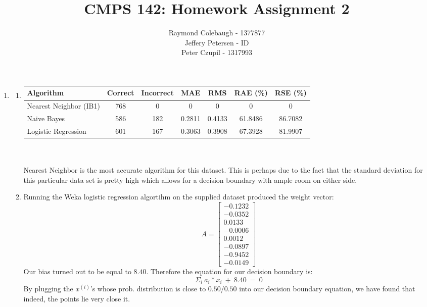 \documentclass{article}
\title{CMPS 142: Homework Assignment 2}
\author{Raymond Colebaugh - 1377877\\Jeffery Petersen - ID\\Peter Czupil - 1317993}
\begin{document}
\maketitle
\begin{enumerate}
        \item 
            \begin{enumerate}
                \item
                    \begin{tabular}{l | c c c c c c}
                        Algorithm      & Correct & Incorrect & MAE & RMS & RAE (\%) & RSE (\%)\\
                        \hline
                        Nearest Neighbor (IB1) & 768 & 0   & 0      & 0      & 0 & 0 \\
                        Naive Bayes            & 586 & 182 & 0.2811 & 0.4133 & 61.8486 & 86.7082 \\
                        Logistic Regression    & 601 & 167 & 0.3063 & 0.3908 & 67.3928 & 81.9907
                    \end{tabular}\\\\
                    Nearest Neighbor is the most accurate algorithm for this dataset. This is perhaps due to 			 the fact that the standard deviation for this particular data set is pretty high which 				 allows for a decision boundary with ample room on either side. 
                \item 
                   Running the Weka logistic regression algortihm on the supplied dataset produced the 				weight vector:
		$$
     			A=\begin{bmatrix}
         				-0.1232 \\
         				-0.0352 \\
        				0.0133 \\
         				-0.0006 \\
				0.0012 \\
				-0.0897 \\
				-0.9452 \\
				-0.0149
       			 \end{bmatrix}
  		$$
		Our bias turned out to be equal to $8.40$. Therefore the equation for our decision 				boundary is: 
		$$\Sigma_i \ a_i * x_i \ + \ 8.40\ = \ 0$$
		By plugging the $x^{(i)}$'s whose prob. distribution is close to $0.50$/$0.50$ into our 				decision boundary equation, we have found that indeed, the points lie very close it.   
	     \\\\

\end{enumerate}
\end{enumerate}
\end{document}
